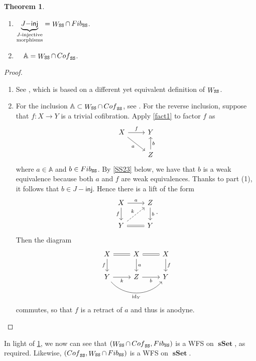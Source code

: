 \documentclass[10pt,letterpaper,cm]{nupset}
\theoremstyle{definition}
\theoremstyle{theorem}
\newtheorem{theorem}[definition]{Theorem}
\theoremstyle{remark}
\newcommand{\0}{\mathbf{0}}
\newcommand{\1}{\mathbf{1}}
\newcommand{\2}{\mathbf{2}}
\DeclareMathOperator{\sset}{\mathbf{sSet}}
\DeclareMathOperator{\idd}{id}
\DeclareMathOperator{\fib}{\mathnormal{Fib}}
\DeclareMathOperator{\cof}{\mathnormal{Cof}}
\DeclareMathOperator{\we}{\mathnormal{W}}
\newcommand{\be}{\begin{enumerate}}
\newcommand{\ee}{\end{enumerate}}
\begin{document}
\begin{theorem}\label{classseq} $ $
\be[label=(\arabic*)]
\item $\underbrace{J{-}\mathsf{inj}}_{\substack{\text{$J$-injective} \\ \text{morphisms}}}= \we_{\mathtt{SS}} \cap \fib_{\mathtt{SS}}$.
\item\ \ $\mathbb{A} = \we_{\mathtt{SS}} \cap \cof_{\mathtt{SS}}$.
\ee 
\end{theorem}
\pagebreak
\begin{proof} $ $
\be[label=(\arabic*)]
\item See \cite[Proposition 3.4.1]{Joyal}, which is based on a different yet equivalent definition of $\we_{\mathtt{SS}}$.
\item For the inclusion $\mathbb{A} \subset \we_{\mathtt{SS}} \cap \cof_{\mathtt{SS}}$, see \cite[Proposition 3.2.3]{Hovey}. For the reverse inclusion, suppose that $f : X \to  Y$ is a trivial cofibration. Apply \cref{fact1} to factor $f$ as
\[
\begin{tikzcd}
X \arrow[r, "f"] \arrow[rd, "a"'] & Y                 \\
                                  & Z \arrow[u, "b"']
\end{tikzcd}
\] where $a\in \mathbb{A}$ and $b\in \fib_{\mathtt{SS}}$. By \cref{SS23} below, we have that $b$ is a weak equivalence because both $a$ and $f$ are weak equivalences. Thanks to part (1), it follows that $b\in J{-}\mathsf{inj}$. Hence there is a lift of the form
\[
\begin{tikzcd}
X \arrow[r, "a"] \arrow[d, "f"']     & Z \arrow[d, "b"] \\
Y \arrow[r, equal] \arrow[ru, dashed, "k"] & Y               
\end{tikzcd}
.\] Then the diagram
\[
\begin{tikzcd}
X \arrow[r, equal] \arrow[d, "f"']                            & X \arrow[r, equal] \arrow[d, "a"] & X \arrow[d, "f"] \\
Y \arrow[r, "k"'] \arrow[rr, "\idd_Y"', bend right=49] & Z \arrow[r, "b"']          & Y               
\end{tikzcd}
\] commutes, so that $f$ is a retract of $a$ and thus is anodyne.
\ee
\end{proof}

\smallskip

In light of \cref{classseq}, we now can see that $\mleft(\we_{\mathtt{SS}} \cap \cof_{\mathtt{SS}}, \fib_{\mathtt{SS}}\mright)$ is a WFS on $\sset$, as required. Likewise, $\mleft(\cof_{\mathtt{SS}}, \we_{\mathtt{SS}} \cap \fib_{\mathtt{SS}}\mright)$ is a WFS on $\sset$.
\end{document}
